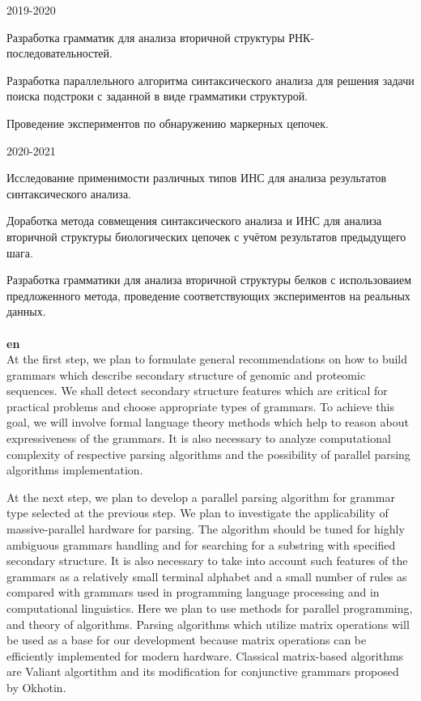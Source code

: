 \documentclass[12pt]{article}  %
\theoremstyle{remark}
\begin{document}
2019-2020

Разработка грамматик для анализа вторичной структуры РНК-последовательностей.

Разработка параллельного алгоритма синтаксического анализа для решения задачи поиска подстроки с заданной в виде грамматики структурой.

Проведение экспериментов по обнаружению маркерных цепочек.

2020-2021

Исследование применимости различных типов ИНС для анализа результатов синтаксического анализа.

Доработка метода совмещения синтаксического анализа и ИНС для анализа вторичной структуры биологических цепочек с учётом результатов предыдущего шага.

Разработка грамматики для анализа вторичной структуры белков с использоваием предложенного метода, проведение соответствующих экспериментов на реальных данных.
\\
\\
\textbf{en}\\
At the first step, we plan to formulate general recommendations on how to build grammars which describe secondary structure of genomic and proteomic sequences.
We shall detect secondary structure features which are critical for practical problems and choose appropriate types of grammars.
To achieve this goal, we will involve formal language theory methods which help to reason about expressiveness of the grammars.
It is also necessary to analyze computational complexity of respective parsing algorithms and the possibility of parallel parsing algorithms implementation.

At the next step, we plan to develop a parallel parsing algorithm for grammar type selected at the previous step.
We plan to investigate the applicability of massive-parallel hardware for parsing.
The algorithm should be tuned for highly ambiguous grammars handling and for searching for a substring with specified secondary structure.
It is also necessary to take into account such features of the grammars as a relatively small terminal alphabet and a small number of rules as compared with grammars used in programming language processing and in computational linguistics.
Here we plan to use methods for parallel programming, and theory of algorithms.
Parsing algorithms which utilize matrix operations will be used as a base for our development because matrix operations can be efficiently implemented for modern hardware.
Classical matrix-based algorithms are Valiant algortithm and its modification for conjunctive grammars proposed by Okhotin.
\end{document}
